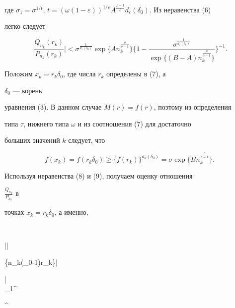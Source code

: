 где $\sigma_1=\sigma^{1/t}$, $t=(\omega(1-\varepsilon))^{1/\rho} 


A^{\frac{\rho-1}{\rho}}d_\varepsilon(\delta_0)$. Из неравенства (6) 


легко следует 


\begin{equation} 


\bigg|\frac{Q_{n_k}(r_k)}{P_{n_k}(r_k)}\bigg|< 


\sigma^{\frac{1}{d_\varepsilon(\delta_0)}}\exp 


\{A n_k^{\frac{\rho}{\rho-1}}\}\bigg\{1- 


\frac{\sigma^{\frac{1}{d_\varepsilon(\delta_0)}}} 


{\exp\{(B-A)n_k^{\frac{\rho}{\rho-1}}\}}\bigg\}^{-1}. 


\end{equation} 


Положим $x_k=r_k\delta_0$, где числа $r_k$ определены в (7), а 


$\delta_0$ --- корень  


уравнения (3). В данном случае $M(r)=f(r)$, поэтому из определения 


типа $\tau$, нижнего типа $\omega$ и из соотношения (7) для достаточно  


больших значений $k$ следует, что 


\begin{equation} 


f(x_k)=f(r_k\delta_0)\ge\{f(r_k)\}^{d_\varepsilon(\delta_0)}= 


\sigma\exp\{B n_k^{\frac{\rho}{\rho-1}}\}. 


\end{equation} 


Используя неравенства (8) и (9), получаем оценку отношения 


$\frac{Q_{n_k}}{P_{n_k}}$ в  


точках $x_k=r_k\delta_0$, а именно, 


$$


\bigg|\bigg|\le 


\exp\{n_k(\delta_0-1)r_k\}\bigg| 


\bigg|\le \\ 


% 


\sigma_1^{} 


\sigma^{}\exp 


